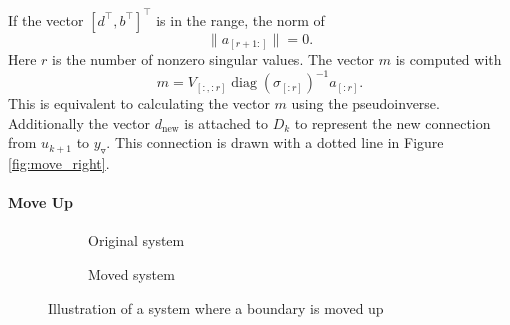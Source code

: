 \documentclass[doctype=mastersthesis,BCOR=15mm,biblatex]{ldvbook}%
\DeclareMathOperator{\diag}{diag}
\newcommand{\m}{\triangledown} %
\begin{document}
If the vector $[d^\top,b^\top]^\top$ is in the range, the norm of 
\begin{equation}
	\|a_{[r+1:]} \| = 0
	.
\end{equation}
Here $r$ is the number of nonzero singular values.
The vector $m$ is computed with 
\begin{equation}
	m = V_{[:,:r]} \diag(\sigma_{[:r]})^{-1} a_{[:r]}
	.
\end{equation}
This is equivalent to calculating the vector $m$ using the pseudoinverse.  
Additionally the vector $d_\text{new}$ is attached to $D_k$ to represent the new connection from $u_{k+1}$ to $y_\m$.
This connection is drawn with a dotted line in Figure\,\ref{fig:move_right}.




\paragraph{Move Up}
\begin{figure}[!htb]
	\centering
	
	\begin{subfigure}[b]{0.45\textwidth}
		\caption{Original system}
		\label{fig:move_up_a}
	\end{subfigure}
	\hspace{0.8cm}
	\begin{subfigure}[b]{0.45\textwidth}
		\caption{Moved system}
		\label{fig:move_up_b}
	\end{subfigure}
	\caption{Illustration of a system where a boundary is moved up}
	\label{fig:move_up}
\end{figure}
\end{document}
